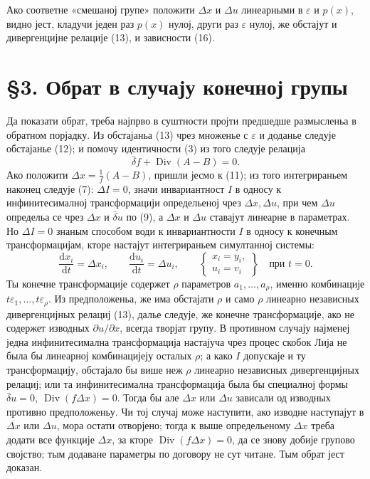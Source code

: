 ﻿\documentclass[11pt]{article}
\providecommand{\eps}{\varepsilon}
\providecommand{\D}{\Delta}
\providecommand{\p}{\partial}
\providecommand{\dd}{\mathrm d}
\DeclareMathOperator{\Div}{Div}
\providecommand{\bd}{\bar{\delta}}
\begin{document}
Ако соответне «смешаној групе» положити \(\D x\) и \(\D u\) линеарными в \(\eps\) и \(p(x)\), видно јест, кладучи једен раз \(p(x)\) нулој, други раз \(\eps\) нулој, же обстајут и дивергенцијне релације (13), и зависности (16).

\section*{\S{}3. Обрат в случају конечној групы}

Да показати обрат, треба најпрво в суштности пројти предшедше размысленьа в обратном порјадку. Из обстајаньа (13) чрез множенье с \(\eps\) и доданье следује обстајанье (12); и помочу идентичности (3) из того следује релација
\[
\bd f+\Div(A-B)=0.
\]
Ако положити \(\D x=\frac{1}{f}(A-B)\), пришли јесмо к (11); из того интегрираньем наконец следује (7): \(\D I=0\), значи инвариантност \(I\) в односу к инфинитесималној трансформацији определьеној чрез \(\D x,\D u\), при чем \(\D u\) определьа се чрез \(\D x\) и \(\bd u\) по (9), а \(\D x\) и \(\D u\) ставајут линеарне в параметрах. Но \(\D I=0\) знаным способом води к инвариантности \(I\) в односу к конечным трансформацијам, кторе настајут интегрираньем симултанној системы:
\begin{equation}
\frac{\dd x_i}{\dd t}=\D x_i,\qquad
\frac{\dd u_i}{\dd t}=\D u_i,\qquad
\left\{\begin{array}{l}
x_i=y_i,\\
u_i=v_i
\end{array}\right\}
\quad\text{при }t=0.
\tag{17}
\end{equation}
Ты конечне трансформације содержет \(\rho\) параметров \(a_1,\ldots,a_\rho\), именно комбинације \(t\eps_1,\ldots,t\eps_\rho\). Из предположеньа, же има обстајати \(\rho\) и само \(\rho\) линеарно независных дивергенцијных релациј (13), далье следује, же конечне трансформације, ако не содержет изводных \(\p u/\p x\), всегда творјат групу. В противном случају најменеј једна инфинитесимална трансформација настајуча чрез процес скобок Лија не была бы линеарној комбинацијеју осталых \(\rho\); а како \(I\) допускаје и ту трансформацију, обстајало бы више неж \(\rho\) линеарно независных дивергенцијных релациј; или та инфинитесимална трансформација была бы специалној формы \(\bd u=0,\ \Div(f\D x)=0\). Тогда бы але \(\D x\) или \(\D u\) зависали од изводных противно предположеньу. Чи тој случај може наступити, ако изводне наступајут в \(\D x\) или \(\D u\), мора остати отворјено; тогда к выше определьеному \(\D x\) треба додати все функције \(\D x\), за кторе \(\Div(f\D x)=0\), да се знову добије групово својство; тым додаване параметры по договору не сут читане. Тым обрат јест доказан.
\end{document}
